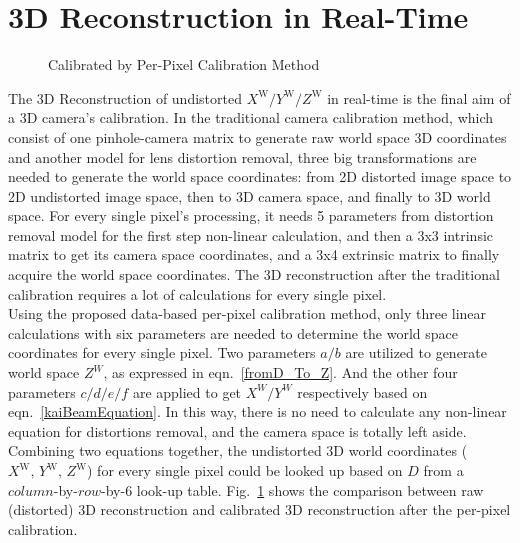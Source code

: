 \section{3D Reconstruction in Real-Time}
\begin{figure}[t]
\centering
\hspace*{-0.3cm}
%
%
\caption{Calibrated by Per-Pixel Calibration Method}
\label{perPixelCalibrationBeforeAfter}
\end{figure}%
%
%
The 3D Reconstruction of undistorted \(X^\text{W}/Y^\text{W}/Z^\text{W}\) in real-time is the final aim of a 3D camera's calibration. In the traditional camera calibration method, which consist of one pinhole-camera matrix to generate raw world space 3D coordinates and another model for lens distortion removal, three big transformations are needed to generate the world space coordinates: from 2D distorted image space to 2D undistorted image space, then to 3D camera space, and finally to 3D world space. For every single pixel's processing, it needs 5 parameters from distortion removal model for the first step non-linear calculation, and then a 3x3 intrinsic matrix to get its camera space coordinates, and a 3x4 extrinsic matrix to finally acquire the world space coordinates. The 3D reconstruction after the traditional calibration requires a lot of calculations for every single pixel.
\\\indent
Using the proposed data-based per-pixel calibration method, only three linear calculations with six parameters are needed to determine the world space coordinates for every single pixel. Two parameters \(a/b\) are utilized to generate world space \(Z^W\), as expressed in eqn.~\ref{fromD_To_Z}. And the other four parameters \(c/d/e/f\) are applied to get \(X^W/Y^W\) respectively based on eqn.~\ref{kaiBeamEquation}. In this way, there is no need to calculate any non-linear equation for distortions removal, and the camera space is totally left aside. Combining two equations together, the undistorted 3D world coordinates (\(X^\text{W}, \, Y^\text{W}, \, Z^\text{W}\)) for every single pixel could be looked up based on \(D\) from a \(column\)-by-\(row\)-by-\(6\) look-up table. Fig.~\ref{perPixelCalibrationBeforeAfter} shows the comparison between raw (distorted) 3D reconstruction and calibrated 3D reconstruction after the per-pixel calibration.
%
%
%

















